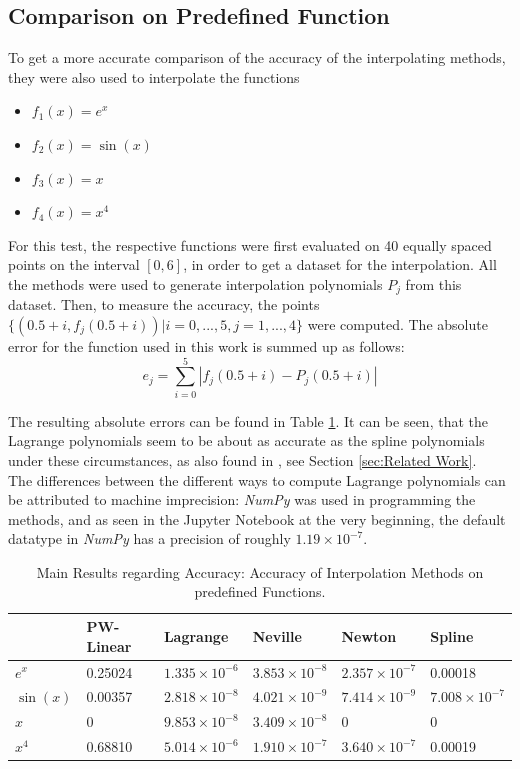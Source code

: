 \documentclass[a4paper,11pt, notitlepage]{article}
\begin{document}
\begin{onehalfspace}
\subsection{Comparison on Predefined Function}
\label{subsec:cmppre}
To get a more accurate comparison of the accuracy of the interpolating methods, they were also used to interpolate the functions
\begin{itemize}
	\item $f_1(x)=e^x$
	\item $f_2(x)=\sin(x)$
	\item $f_3(x)=x$
	\item $f_4(x)=x^4$
\end{itemize}
For this test, the respective functions were first evaluated on 40 equally spaced points on the interval $[0, 6]$, in order to get a dataset for the interpolation. All the methods were used to generate interpolation polynomials $P_j$ from this dataset. Then, to measure the accuracy, the points $\{(0.5+i, f_j(0.5+i))|i=0,...,5, j=1,...,4\}$ were computed. The absolute error for the function used in this work is summed up as follows:
$$e_j=\sum_{i=0}^{5}|f_j(0.5+i) - P_j(0.5+i)|$$

The resulting absolute errors can be found in Table \ref{tab:acc-pred}. It can be seen, that the Lagrange polynomials seem to be about as accurate as the spline polynomials under these circumstances, as also found in \cite{mcnamee1986comparison}, see Section \ref{sec:Related Work}. \\
The differences between the different ways to compute Lagrange polynomials can be attributed to machine imprecision: \emph{NumPy} was used in programming the methods, and as seen in the Jupyter Notebook at the very beginning, the default datatype in \emph{NumPy} has a precision of roughly $1.19 \times 10^{-7}$.

\begin{table}[H]
	\centering
	\begin{tabular}{|l|l|l|l|l|l|}
		\hline
		& PW-Linear & Lagrange               & Neville                & Newton                  & Spline                  \\ \hline
		$e^x$               & 0.25024   & $1.335 \times 10^{-6}$ & $3.853 \times 10^{-8}$ & $2.357 \times 10^{-7}$ & 0.00018                 \\ \hline
		$\sin(x)$               & 0.00357   & $2.818 \times 10^{-8}$ & $4.021 \times 10^{-9}$ & $7.414 \times 10^{-9}$  & $7.008 \times 10^{-7}$ \\ \hline
		$x$                    & 0         & $9.853 \times 10^{-8}$ & $3.409 \times 10^{-8}$ & 0                       & 0                       \\ \hline
		$x^4$ & 0.68810   & $5.014 \times 10^{-6}$ & $1.910 \times 10^{-7}$ & $3.640 \times 10^{-7}$  & 0.00019                 \\ \hline
	\end{tabular}
	\caption{Main Results regarding Accuracy: Accuracy of Interpolation Methods on predefined Functions.}
	\label{tab:acc-pred}
\end{table}



\end{onehalfspace}
\end{document}
